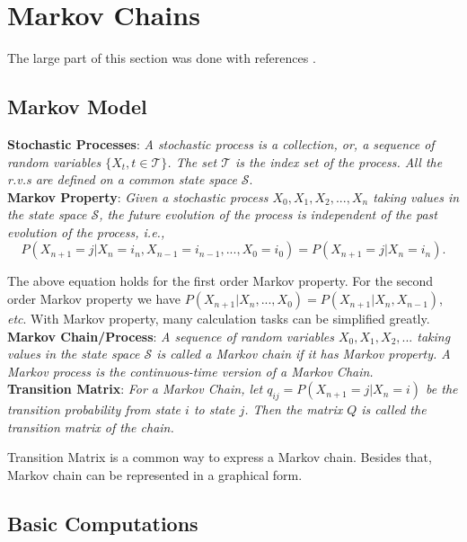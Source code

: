 \documentclass{progartcn}
\begin{document}
    	\pagebreak

\pagebreak

\section{Markov Chains}

	The large part of this section was done with references \cite{si252,HB,robert2013monte}.\\

	\subsection{Markov Model}

		\textbf{Stochastic Processes}: \textit{A stochastic process is a collection, or, a sequence of random variables $\{X_t,t\in \mathcal{T}\}$. The set $\mathcal{T}$ is the index set of the process. All the \textit{r.v.}s are defined on a common state space $\mathcal{S}$}.\\
		
		\textbf{Markov Property}: \textit{Given a stochastic process $X_0, X_1, X_2, ..., X_n$ taking values in the state space $\mathcal{S}$, the future evolution of the process is independent of the past evolution of the process, i.e.,}
		\[P(X_{n+1}=j|X_n=i_n,X_{n-1}=i_{n-1},...,X_0=i_0)=P(X_{n+1}=j|X_n=i_n).\]

		The above equation holds for the first order Markov property. For the second order Markov property we have $P(X_{n+1}|X_n, ...,X_0)=P(X_{n+1}|X_n,X_{n-1})$, \textit{etc}. With Markov property, many calculation tasks can be simplified greatly.\\
	
		\textbf{Markov Chain/Process}: \textit{A sequence of random variables $X_0, X_1, X_2, ...$ taking values in the state space $\mathcal{S}$ is called a Markov chain if it has Markov property. A Markov process is the continuous-time version of a Markov Chain.}\\

		\textbf{Transition Matrix}: \textit{For a Markov Chain, let $q_{ij}=P(X_{n+1}=j|X_n=i)$ be the transition probability from state $i$ to state $j$. Then the matrix $Q$ is called the transition matrix of the chain.}

		Transition Matrix is a common way to express a Markov chain. Besides that, Markov chain can be represented in a graphical form.\\

	\subsection{Basic Computations}
\end{document}
